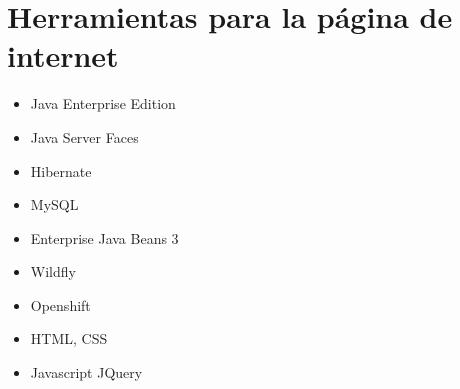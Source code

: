 \chapter{Herramientas para la página de internet}\label{chap:webTools}

\begin{itemize}
	\item Java Enterprise Edition
	\item Java Server Faces
	\item Hibernate
	\item MySQL
	\item Enterprise Java Beans 3
	\item Wildfly
	\item Openshift
	\item HTML, CSS
	\item Javascript JQuery
\end{itemize}